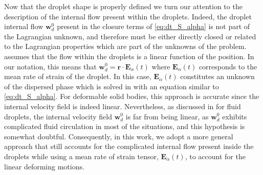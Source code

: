 Now that the droplet shape is properly defined we turn our attention to the description of the internal flow present within the droplets.
Indeed, the droplet internal flow $\textbf{w}_d^0$ present in the closure terms of \ref{eq:dt_S_alpha} is not part of the Lagrangian unknown, and therefore must be either directly closed or related to the Lagrangian properties which are part of the unknowns of the problem.  
\citet{lhuillier1987phenomenology} assumes that the flow within the droplets is a linear function of the position. 
In our notation, this means that $\textbf{w}_d^0 = \textbf{r}\cdot \textbf{E}_\alpha(t)$ where $\textbf{E}_\alpha(t)$ corresponds to the mean rate of strain of the droplet. 
In this case, $\textbf{E}_\alpha(t)$ constitutes an unknown of the dispersed phase which is solved in \citet{lhuillier1987phenomenology} with an equation similar to \ref{eq:dt_S_alpha}. 
For deformable solid bodies, this approach is accurate since the internal velocity field is indeed linear.
Nevertheless, as discussed in \citet{lhuillier1987phenomenology} for fluid droplets, the internal velocity field $\textbf{w}_d^0$ is far from being linear, as $\textbf{w}_d^0$ exhibits complicated fluid circulation in most of the situations, and this hypothesis is somewhat doubtful. 
Consequently, in this work, we adopt a more general approach that still accounts for the complicated internal flow present inside the droplets while using a mean rate of strain tensor, $\textbf{E}_\alpha(t)$, to account for the linear deforming motions. 

